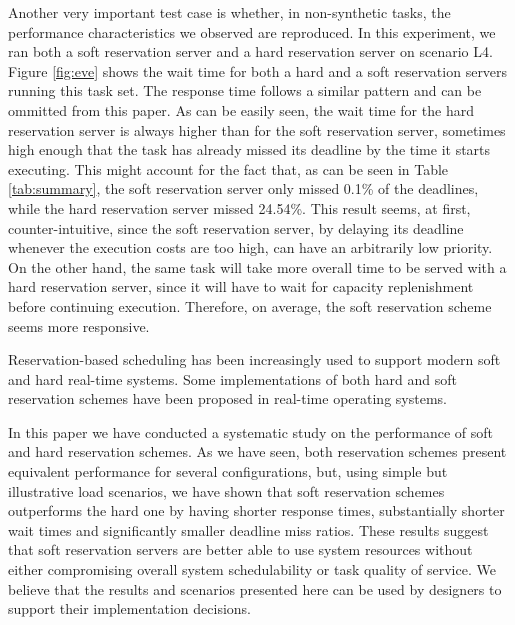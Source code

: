 \documentclass[times, 10pt,twocolumn]{article}
\begin{document}
Another very important test case is whether, in non-synthetic tasks,
the performance characteristics we observed are reproduced. In this
experiment, we ran both a soft reservation server and a hard
reservation server on scenario L4. Figure \ref{fig:eve} shows the wait
time for both a hard and a soft reservation servers running this task
set. The response time follows a similar pattern and can be ommitted
from this paper. As can be easily seen, the wait time for the hard
reservation server is always higher than for the soft reservation
server, sometimes high enough that the task has already missed its
deadline by the time it starts executing. This might account for the
fact that, as can be seen in Table \ref{tab:summary}, the soft
reservation server only missed 0.1\% of the deadlines, while the hard
reservation server missed 24.54\%. This result seems, at first,
counter-intuitive, since the soft reservation server, by delaying its
deadline whenever the execution costs are too high, can have an
arbitrarily low priority. On the other hand, the same task will take
more overall time to be served with a hard reservation server, since
it will have to wait for capacity replenishment before continuing
execution. Therefore, on average, the soft reservation scheme seems
more responsive.

\label{sec:conclusion}

Reservation-based scheduling has been increasingly used to support
modern soft and hard real-time systems. Some implementations of both
hard and soft reservation schemes have been proposed in real-time
operating systems.

In this paper we have conducted a systematic study on the performance
of soft and hard reservation schemes. As we have seen, both
reservation schemes present equivalent performance for several
configurations, but, using simple but illustrative load scenarios, we
have shown that soft reservation schemes outperforms the hard one by
having shorter response times, substantially shorter wait times and
significantly smaller deadline miss ratios. These results suggest that
soft reservation servers are better able to use system resources
without either compromising overall system schedulability or task
quality of service. We believe that the results and scenarios
presented here can be used by designers to support their 
implementation decisions.



\end{document}
